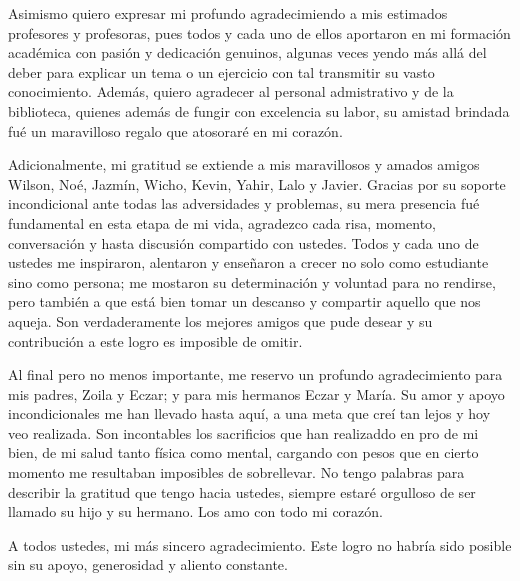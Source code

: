 Asimismo quiero expresar mi profundo agradecimiendo a mis estimados profesores y profesoras, pues todos y cada uno de ellos aportaron en mi formación académica con pasión y dedicación genuinos, algunas veces yendo más allá del deber para explicar un tema o un ejercicio con tal transmitir su vasto conocimiento. Además, quiero agradecer al personal admistrativo y de la biblioteca, quienes además de fungir con excelencia su labor, su amistad brindada fué un maravilloso regalo que atosoraré en mi corazón. 

Adicionalmente, mi gratitud se extiende a mis maravillosos y amados amigos Wilson, Noé, Jazmín, Wicho, Kevin, Yahir, Lalo y Javier. Gracias por su soporte incondicional ante todas las adversidades y problemas, su mera presencia fué fundamental en esta etapa de mi vida, agradezco cada risa, momento, conversación y hasta discusión compartido con ustedes. Todos y cada uno de ustedes me inspiraron, alentaron y enseñaron a crecer no solo como estudiante sino como persona; me mostaron su determinación y voluntad para no rendirse, pero también a que está bien tomar un descanso y compartir aquello que nos aqueja. Son verdaderamente los mejores amigos que pude desear y su contribución a este logro es imposible de omitir.

Al final pero no menos importante, me reservo un profundo agradecimiento para mis padres, Zoila y Eczar; y para mis hermanos Eczar y María. Su amor y apoyo incondicionales me han llevado hasta aquí, a una meta que creí tan lejos y hoy veo realizada. Son incontables los sacrificios que han realizaddo en pro de mi bien, de mi salud tanto física como mental, cargando con pesos que en cierto momento me resultaban imposibles de sobrellevar. No tengo palabras para describir la gratitud que tengo hacia ustedes, siempre estaré orgulloso de ser llamado su hijo y su hermano. Los amo con todo mi corazón.

A todos ustedes, mi más sincero agradecimiento. Este logro no habría sido posible sin su apoyo, generosidad y aliento constante.
